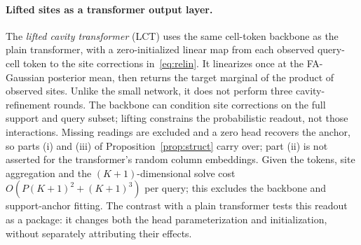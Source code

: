 \paragraph{Lifted sites as a transformer output layer.}\label{sec:method-lct}
The \emph{lifted cavity transformer} (LCT) uses the same cell-token backbone as the plain transformer, with a
zero-initialized linear map from each observed query-cell token to the site corrections in~\eqref{eq:relin}.
It linearizes once at the FA-Gaussian posterior mean, then returns the target marginal of the product of observed
sites. Unlike the small network, it does not perform three cavity-refinement rounds. The backbone can condition
site corrections on the full support and query subset; lifting constrains the probabilistic readout, not those
interactions. Missing readings are excluded and a zero head recovers the anchor, so parts (i) and (iii) of
Proposition~\ref{prop:struct} carry over; part (ii) is not asserted for the transformer's random column embeddings.
Given the tokens, site aggregation and the $(K+1)$-dimensional solve cost
$O(P(K+1)^2+(K+1)^3)$ per query; this excludes the backbone and support-anchor fitting.
The contrast with a plain transformer tests this readout as a package: it changes both the head parameterization
and initialization, without separately attributing their effects.
